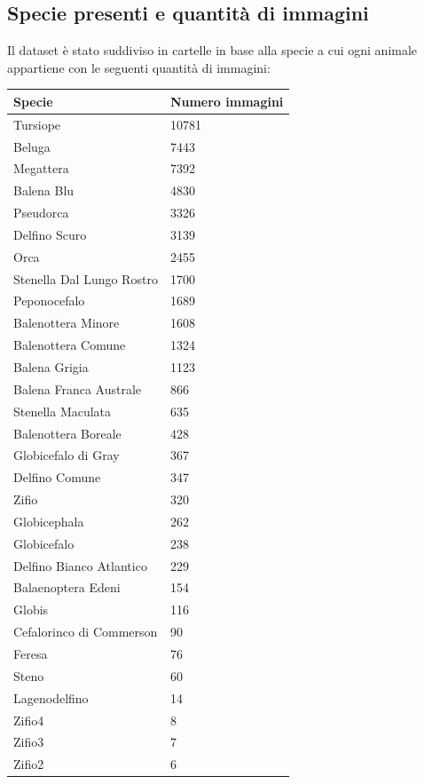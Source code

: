 \documentclass[a4paper,final,12pt]{report}
\begin{document}
\subsection{Specie presenti e quantità di immagini}
Il dataset è stato suddiviso in cartelle in base alla specie a cui ogni animale appartiene con le seguenti quantità di immagini:

\begin{longtable}{p{}p{}}
\toprule
\textbf{Specie} & \textbf{Numero immagini} \\
\midrule
\endfirsthead
%
\endhead
%
\bottomrule
%
\endlastfoot
%
Tursiope & 10781 \\
Beluga & 7443 \\
Megattera & 7392 \\
Balena Blu & 4830 \\
Pseudorca & 3326 \\
Delfino Scuro & 3139 \\
Orca & 2455 \\
Stenella Dal Lungo Rostro & 1700 \\
Peponocefalo & 1689 \\
Balenottera Minore & 1608 \\
Balenottera Comune & 1324 \\
Balena Grigia & 1123 \\
Balena Franca Australe & 866 \\
Stenella Maculata & 635 \\
Balenottera Boreale & 428 \\
Globicefalo di Gray & 367 \\
Delfino Comune & 347 \\
Zifio & 320 \\
Globicephala & 262 \\
Globicefalo & 238 \\
Delfino Bianco Atlantico & 229 \\
Balaenoptera Edeni & 154 \\
Globis & 116 \\
Cefalorinco di Commerson & 90 \\
Feresa & 76 \\
Steno & 60 \\
Lagenodelfino & 14 \\
Zifio4 & 8 \\
Zifio3 & 7 \\
Zifio2 & 6 \\
\end{longtable}
\end{document}
